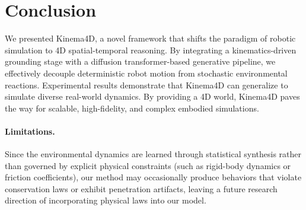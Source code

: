 \section{Conclusion}
We presented Kinema4D, a novel framework that shifts the paradigm of robotic simulation to 4D spatial-temporal reasoning. By integrating a kinematics-driven grounding stage with a diffusion transformer-based generative pipeline, we effectively decouple deterministic robot motion from stochastic environmental reactions. Experimental results demonstrate that Kinema4D can generalize to simulate diverse real-world dynamics. By providing a 4D world, Kinema4D paves the way for scalable, high-fidelity, and complex embodied simulations.

\paragraph{Limitations.} Since the environmental dynamics are learned through statistical synthesis rather than governed by explicit physical constraints (such as rigid-body dynamics or friction coefficients), our method may occasionally produce behaviors that violate conservation laws or exhibit penetration artifacts, leaving a future research direction of incorporating physical laws into our model.

